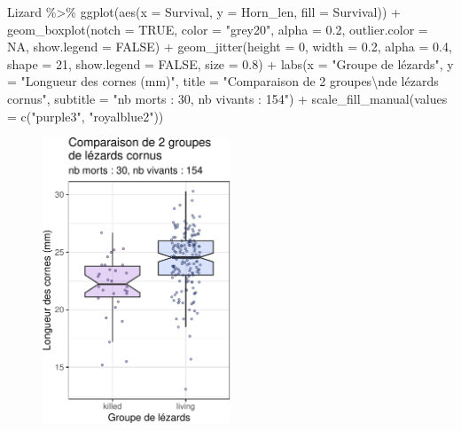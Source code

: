 \documentclass[
  a4paper,
  DIV=11,
  numbers=noendperiod,
  oneside]{scrreprt}
\newenvironment{Shaded}{}{}
\newcommand{\AttributeTok}[1]{\textcolor[rgb]{0.84,0.23,0.29}{#1}}
\newcommand{\ConstantTok}[1]{\textcolor[rgb]{0.00,0.36,0.77}{#1}}
\newcommand{\DecValTok}[1]{\textcolor[rgb]{0.00,0.36,0.77}{#1}}
\newcommand{\FloatTok}[1]{\textcolor[rgb]{0.00,0.36,0.77}{#1}}
\newcommand{\FunctionTok}[1]{\textcolor[rgb]{0.44,0.26,0.76}{#1}}
\newcommand{\NormalTok}[1]{\textcolor[rgb]{0.14,0.16,0.18}{#1}}
\newcommand{\SpecialCharTok}[1]{\textcolor[rgb]{0.00,0.36,0.77}{#1}}
\newcommand{\StringTok}[1]{\textcolor[rgb]{0.01,0.18,0.38}{#1}}
\begin{document}
\begin{Shaded}
\begin{Highlighting}[]
\NormalTok{Lizard }\SpecialCharTok{\%\textgreater{}\%}
  \FunctionTok{ggplot}\NormalTok{(}\FunctionTok{aes}\NormalTok{(}\AttributeTok{x =}\NormalTok{ Survival, }\AttributeTok{y =}\NormalTok{ Horn\_len, }\AttributeTok{fill =}\NormalTok{ Survival)) }\SpecialCharTok{+}
  \FunctionTok{geom\_boxplot}\NormalTok{(}\AttributeTok{notch =} \ConstantTok{TRUE}\NormalTok{, }\AttributeTok{color =} \StringTok{"grey20"}\NormalTok{, }\AttributeTok{alpha =} \FloatTok{0.2}\NormalTok{,}
               \AttributeTok{outlier.color =} \ConstantTok{NA}\NormalTok{, }\AttributeTok{show.legend =} \ConstantTok{FALSE}\NormalTok{) }\SpecialCharTok{+}
  \FunctionTok{geom\_jitter}\NormalTok{(}\AttributeTok{height =} \DecValTok{0}\NormalTok{, }\AttributeTok{width =} \FloatTok{0.2}\NormalTok{, }\AttributeTok{alpha =} \FloatTok{0.4}\NormalTok{, }\AttributeTok{shape =} \DecValTok{21}\NormalTok{,}
              \AttributeTok{show.legend =} \ConstantTok{FALSE}\NormalTok{, }\AttributeTok{size =} \FloatTok{0.8}\NormalTok{) }\SpecialCharTok{+}
  \FunctionTok{labs}\NormalTok{(}\AttributeTok{x =} \StringTok{"Groupe de lézards"}\NormalTok{,}
       \AttributeTok{y =} \StringTok{"Longueur des cornes (mm)"}\NormalTok{,}
       \AttributeTok{title =} \StringTok{"Comparaison de 2 groupes}\SpecialCharTok{\textbackslash{}n}\StringTok{de lézards cornus"}\NormalTok{,}
       \AttributeTok{subtitle =} \StringTok{"nb morts : 30, nb vivants : 154"}\NormalTok{) }\SpecialCharTok{+}
  \FunctionTok{scale\_fill\_manual}\NormalTok{(}\AttributeTok{values =} \FunctionTok{c}\NormalTok{(}\StringTok{"purple3"}\NormalTok{, }\StringTok{"royalblue2"}\NormalTok{))}
\end{Highlighting}
\end{Shaded}

\begin{figure}[H]

{\centering \includegraphics[width=0.5\textwidth,height=\textheight]{03-TwoSampleTests_files/figure-pdf/unnamed-chunk-15-1.pdf}

}

\end{figure}
\end{document}
